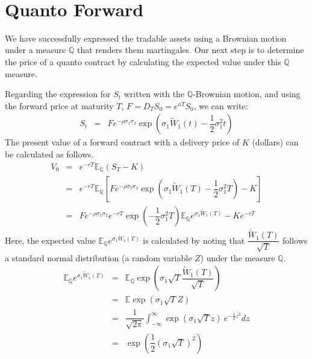 \documentclass[uplatex,a4j,12pt,dvipdfmx]{jsarticle}
\begin{document}
\ \\[-10mm]

\section{Quanto Forward}

We have successfully expressed the tradable assets using a Brownian motion under a measure $\mathbb{Q}$ that renders them martingales.
Our next step is to determine the price of a quanto contract by calculating the expected value under this $\mathbb{Q}$ measure.

Regarding the expression for $S_{t}$ written with the $\mathbb{Q}$-Brownian motion, and using the forward price at maturity $T$, $F = D_{T} S_{0} = e^{uT} S_{0}$, we can write:
%
%
\begin{eqnarray}
	S_{t}
	&=&
	F
	e^{- \rho \sigma_{1} \sigma_{2}}
	\exp \left( \sigma_{1} \tilde{W}_{1}(t) -
	\dfrac{1}{2} \sigma_{1}^{2}
	t \right)
\end{eqnarray}
%
%
The present value of a forward contract with a delivery price of $K$ (dollars) can be calculated as follows.
%
%
\begin{eqnarray}
	V_{0}
	&=&
	e^{-rT}
	\mathbb{E}_{\mathbb{Q}}(S_{T}-K)
	\\ &=&
	e^{-rT}
	\mathbb{E}_{\mathbb{Q}}
	\left[
		F
		e^{- \rho \sigma_{1} \sigma_{2}}
		\exp \left( \sigma_{1} \tilde{W}_{1}(T) -
		\dfrac{1}{2} \sigma_{1}^{2}
		T \right)
		-
		K
		\right]
	\\ &=&
	F
	e^{- \rho \sigma_{1} \sigma_{2}}
	e^{-rT}
	\exp \left( -\dfrac{1}{2} \sigma_{1}^{2} T \right)
	\mathbb{E}_{\mathbb{Q}}
	e^{\sigma_{1} \tilde{W}_{1}(T)}
	-
	Ke^{-rT}
\end{eqnarray}
%
%
Here, the expected value
$\mathbb{E}_{\mathbb{Q}}
	e^{\sigma_{1} \tilde{W}_{1}(T)}$
is calculated by noting that
$\dfrac{\tilde{W}_{1}(T)}{\sqrt{T}}$
follows a standard normal distribution (a random variable $Z$) under the measure $\mathbb{Q}$.
%
%
\begin{eqnarray}
	\mathbb{E}_{\mathbb{Q}}
	e^{\sigma_{1} \tilde{W}_{1}(T)}
	&=&
	\mathbb{E}_{\mathbb{Q}}
	\exp \left( \sigma_{1} \sqrt{T} \dfrac{\tilde{W}_{1}(T)}{\sqrt{T}} \right)
	\\ &=&
	\mathbb{E}
	\exp \left( \sigma_{1} \sqrt{T} Z \right)
	\\ &=&
	\dfrac{1}{ \sqrt{2 \pi} }
	\int^{\infty}_{-\infty}
	\exp \left( \sigma_{1} \sqrt{T} z \right)
	\
	e^{-\frac{1}{2}z^{2}}
	dz
	\\ &=&
	\exp \left( \dfrac{1}{2} (\sigma_{1} \sqrt{T})^{2} \right)
\end{eqnarray}
%
%
\end{document}
